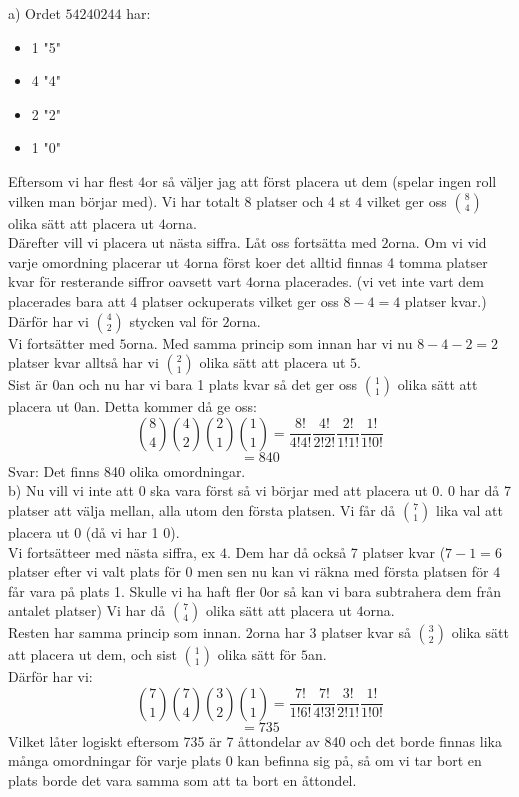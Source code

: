 \documentclass[nobib]{tufte-handout}
\begin{document}
\begin{xca}
a) Ordet $54240244$ har:
\begin{itemize}
  \item 1 "5"
  \item 4 "4"
  \item 2 "2"
  \item 1 "0"
\end{itemize}
Eftersom vi har flest $4$or så väljer jag att först placera ut dem (spelar ingen roll vilken man börjar med). Vi har totalt 8 platser och 4 st $4$ vilket ger oss $\binom{8}{4}$ olika sätt att placera ut $4$orna.\\
Därefter vill vi placera ut nästa siffra. Låt oss fortsätta med $2$orna. Om vi vid varje omordning placerar ut $4$orna först koer det alltid finnas 4 tomma platser kvar för resterande siffror oavsett vart $4$orna placerades. (vi vet inte vart dem placerades bara att 4 platser ockuperats vilket ger oss $8-4=4$ platser kvar.) Därför har vi $\binom{4}{2}$ stycken val för $2$orna.\\
Vi fortsätter med $5$orna. Med samma princip som innan har vi nu $8-4-2=2$ platser kvar alltså har vi $\binom{2}{1}$ olika sätt att placera ut $5$.\\
Sist är $0$an och nu har vi bara 1 plats kvar så det ger oss $\binom{1}{1}$ olika sätt att placera ut $0$an. Detta kommer då ge oss:
$$\binom{8}{4}\binom{4}{2}\binom{2}{1}\binom{1}{1}=\frac{8!}{4!4!}\frac{4!}{2!2!}\frac{2!}{1!1!}\frac{1!}{1!0!}$$
$$=840$$
Svar: Det finns 840 olika omordningar.\\
b) Nu vill vi inte att $0$ ska vara först så vi börjar med att placera ut $0$. $0$ har då 7 platser att välja mellan, alla utom den första platsen. Vi får då $\binom{7}{1}$ lika val att placera ut $0$ (då vi har 1 $0$).\\
Vi fortsätteer med nästa siffra, ex $4$. Dem har då också 7 platser kvar ($7-1=6$ platser efter vi valt plats för $0$ men sen nu kan vi räkna med första platsen för $4$ får vara på plats 1. Skulle vi ha haft fler $0$or så kan vi bara subtrahera dem från antalet platser) Vi har  då $\binom{7}{4}$ olika sätt att placera ut $4$orna.\\
Resten har samma princip som innan. $2$orna har 3 platser kvar så $\binom{3}{2}$ olika sätt att placera ut dem, och sist $\binom{1}{1}$ olika sätt för $5$an.\\
Därför har vi:
$$\binom{7}{1}\binom{7}{4}\binom{3}{2}\binom{1}{1}=\frac{7!}{1!6!}\frac{7!}{4!3!}\frac{3!}{2!1!}\frac{1!}{1!0!}$$
$$=735$$
Vilket låter logiskt eftersom 735 är 7 åttondelar av 840 och det borde finnas lika många omordningar för varje plats 0 kan befinna sig på, så om vi tar bort en plats borde det vara samma som att ta bort en åttondel.
\end{xca}
\end{document}
